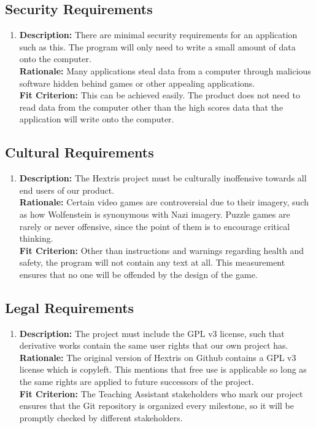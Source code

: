 \documentclass[12pt, titlepage]{article}
\begin{document}
\subsection{Security Requirements}
\begin{enumerate}[label=S\arabic*]
\item \textbf{Description:} There are minimal security requirements for an application such as this. The program will only need to write a small amount of data onto the computer.\\
\textbf{Rationale:} Many applications steal data from a computer through malicious software hidden behind games or other appealing applications.\\
\textbf{Fit Criterion:} This can be achieved easily. The product does not need to read data from the computer other than the high scores data that the application will write onto the computer.

\end{enumerate}



\subsection{Cultural Requirements}
\begin{enumerate}[label=C\arabic*]
\item \textbf{Description:} The Hextris project must be culturally inoffensive towards all end users of our product. \\
\textbf{Rationale:}  Certain video games are controversial due to their imagery, such as how Wolfenstein is synonymous with Nazi imagery. Puzzle games are rarely or never offensive, since the point of them is to encourage critical thinking. \\
\textbf{Fit Criterion:} Other than instructions and warnings regarding health and safety, the program will not contain any text at all. This measurement ensures that no one will be offended by the design of the game. 

\end{enumerate}
\subsection{Legal Requirements}
\begin{enumerate}[label=L\arabic*]
\item \textbf{Description:} The project must include the GPL v3 license, such that derivative works contain the same user rights that our own project has. \\
\textbf{Rationale:} The original version of Hextris on Github contains a GPL v3 license which is copyleft. This mentions that free use is applicable so long as the same rights are applied to future successors of the project. \\
\textbf{Fit Criterion:} The Teaching Assistant stakeholders who mark our project ensures that the Git repository is organized every milestone, so it will be promptly checked by different stakeholders.

\end{enumerate}
\end{document}
